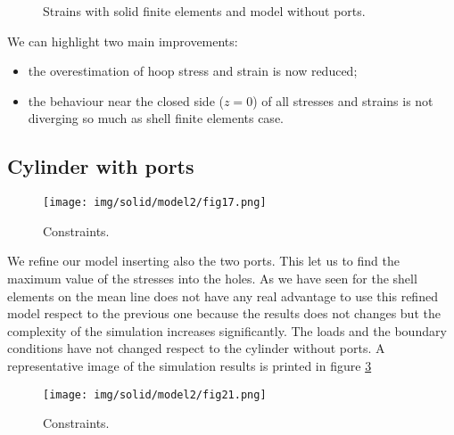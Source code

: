 \documentclass[a4paper,12pt]{article}
\begin{document}
\begin{figure}[H]
\centering     %
\caption{Strains with solid finite elements and model without ports.}
\label{fig:solidmodel1_strain_top_noports}
\end{figure}

We can highlight two main improvements:
\begin{itemize}
\item the overestimation of hoop stress and strain is now reduced;
\item the behaviour near the closed side ($z=0$) of all stresses and strains is not diverging so much as shell finite elements case.
\end{itemize}


\subsection{Cylinder with ports}

\begin{figure}[H]
\centering
\texttt{[image: img/solid/model2/fig17.png]}
\caption{Constraints.}
\label{fig:solidmodel2}
\end{figure}

We refine our model inserting also the two ports. This let us to find the maximum value of the stresses into the holes. As we have seen for the shell elements on the mean line does not have any real advantage to use this refined model respect to the previous one because the results does not changes but the complexity of the simulation increases significantly.
The loads and the boundary conditions have not changed respect to the cylinder without ports.
A representative image of the simulation results is printed in figure \ref{fig:solidmodel2_abqstresses}


\begin{figure}[H]
\centering
\texttt{[image: img/solid/model2/fig21.png]}
\caption{Constraints.}
\label{fig:solidmodel2_abqstresses}
\end{figure}

\end{document}
